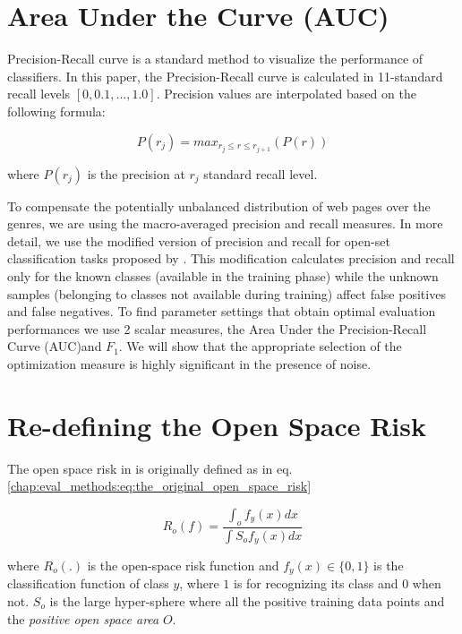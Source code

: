 \section{Area Under the Curve (AUC)}\label{chap:eval_methods:sec:closed_set_classification} 

Precision-Recall curve is a standard method to visualize the performance of classifiers. In this paper, the Precision-Recall curve is calculated in 11-standard recall levels $[0,0.1,...,1.0]$. Precision values are interpolated based on the following formula:

\begin{equation}
	P(r_j)=max_{r_j \leqslant r \leqslant r_{j+1}}(P(r))
\end{equation}

\noindent
where $P(r_j)$ is the precision at $r_j$ standard recall level.


To compensate the potentially unbalanced distribution of web pages over the genres, we are using the macro-averaged precision and recall measures. In more detail, we use the modified version of precision and recall for open-set classification tasks proposed by \parencite{mendesjunior2016}. This modification calculates precision and recall only for the known classes (available in the training phase) while the unknown samples (belonging to classes not available during training) affect false positives and false negatives. To find parameter settings that obtain optimal evaluation performances we use 2 scalar measures, the Area Under the Precision-Recall Curve (AUC)and $F_{1}$. We will show that the appropriate selection of the optimization measure is highly significant in the presence of noise.


\section{Re-defining the Open Space Risk}\label{chap:eval_methods:sec:open_space_risk} 

The open space risk in \parencite{scheirer2013toward} is originally defined as in eq. \ref{chap:eval_methods:eq:the_original_open_space_risk}

\begin{equation}\label{chap:eval_methods:eq:the_original_open_space_risk}
	R_{o}(f) = \frac{\int_{o} f_{y}(x) dx}{\int{S_{o}}  f_{y}(x) dx}

\end{equation}

\noindent
where $R_{o}(.)$ is the open-space risk function and $f_{y}(x)  \in \{0, 1\}$ is the classification function of class $y$, where $1$ is for recognizing its class and $0$ when not. $S_{o}$ is the large hyper-sphere where all the positive training data points and the \textit{positive open space area} $O$. 

